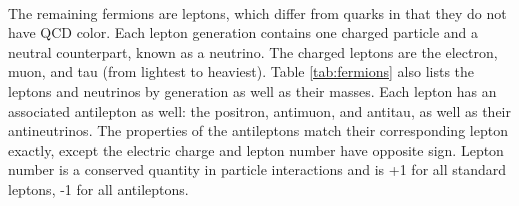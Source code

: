         \\
        \indent The remaining fermions are leptons, which differ from quarks in that they do not have \gls{QCD} color. Each lepton generation contains one charged particle and a neutral counterpart, known as a neutrino. The charged leptons are the electron, muon, and tau (from lightest to heaviest). Table \ref{tab:fermions} also lists the leptons and neutrinos by generation as well as their masses. Each lepton has an associated antilepton as well: the positron, antimuon, and antitau, as well as their antineutrinos. The properties of the antileptons match their corresponding lepton exactly, except the electric charge and lepton number have opposite sign. Lepton number is a conserved quantity in particle interactions and is +1 for all standard leptons, -1 for all antileptons.


